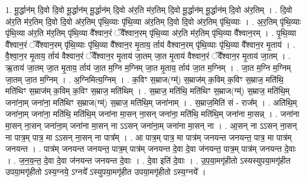 \documentclass[17pt]{extarticle}
\begin{document}
1. मू॒र्द्धान॑म् दि॒वो दि॒वो मू॒र्द्धान॑म् मू॒र्द्धान॑म् दि॒वो अ॑र॒ति म॑र॒तिम् दि॒वो मू॒र्द्धान॑म् मू॒र्द्धान॑म् दि॒वो अ॑र॒तिम् । . दि॒वो अ॑र॒ति म॑र॒तिम् दि॒वो दि॒वो अ॑र॒तिम् पृ॑थि॒व्याः पृ॑थि॒व्या अ॑र॒तिम् दि॒वो दि॒वो अ॑र॒तिम् पृ॑थि॒व्याः । . अ॒र॒तिम् पृ॑थि॒व्याः पृ॑थि॒व्या अ॑र॒ति म॑र॒तिम् पृ॑थि॒व्या वै᳚श्वान॒रं ॅवै᳚श्वान॒रम् पृ॑थि॒व्या अ॑र॒ति म॑र॒तिम् पृ॑थि॒व्या वै᳚श्वान॒रम् । . पृ॒थि॒व्या वै᳚श्वान॒रं ॅवै᳚श्वान॒रम् पृ॑थि॒व्याः पृ॑थि॒व्या वै᳚श्वान॒र मृ॒ताय॒ र्ताय॑ वैश्वान॒रम् पृ॑थि॒व्याः पृ॑थि॒व्या वै᳚श्वान॒र मृ॒ताय॑ । . वै॒श्वा॒न॒र मृ॒ताय॒ र्ताय॑ वैश्वान॒रं ॅवै᳚श्वान॒र मृ॒ताय॑ जा॒तम् जा॒त मृ॒ताय॑ वैश्वान॒रं ॅवै᳚श्वान॒र मृ॒ताय॑ जा॒तम् । . ऋ॒ताय॑ जा॒तम् जा॒त मृ॒ताय॒ र्ताय॑ जा॒त म॒ग्नि म॒ग्निम् जा॒त मृ॒ताय॒ र्ताय॑ जा॒त म॒ग्निम् । . जा॒त म॒ग्नि म॒ग्निम् जा॒तम् जा॒त म॒ग्निम् । . अ॒ग्निमित्य॒ग्निम् । . क॒विꣳ स॒म्राज(ग्म्॑) स॒म्राज॑म् क॒विम् क॒विꣳ स॒म्राज॒ मति॑थि॒ मति॑थिꣳ स॒म्राज॑म् क॒विम् क॒विꣳ स॒म्राज॒ मति॑थिम् । . स॒म्राज॒ मति॑थि॒ मति॑थिꣳ स॒म्राज(ग्म्॑) स॒म्राज॒ मति॑थि॒म् जना॑ना॒म् जना॑ना॒ मति॑थिꣳ स॒म्राज(ग्म्॑) स॒म्राज॒ मति॑थि॒म् जना॑नाम् । . स॒म्राज॒मिति॑ सं - राज᳚म् । . अति॑थि॒म् जना॑ना॒म् जना॑ना॒ मति॑थि॒ मति॑थि॒म् जना॑ना मा॒सन् ना॒सन् जना॑ना॒ मति॑थि॒ मति॑थि॒म् जना॑ना मा॒सन्न् । . जना॑ना मा॒सन् ना॒सन् जना॑ना॒म् जना॑ना मा॒सन् ना ऽऽसन् जना॑ना॒म् जना॑ना मा॒सन् ना । . आ॒सन् ना ऽऽसन् ना॒सन् ना पात्र॒म् पात्र॒ मा ऽऽसन् ना॒सन् ना पात्र᳚म् । . आ पात्र॒म् पात्र॒ मा पात्र॑म् जनयन्त जनयन्त॒ पात्र॒ मा पात्र॑म् जनयन्त । . पात्र॑म् जनयन्त जनयन्त॒ पात्र॒म् पात्र॑म् जनयन्त दे॒वा दे॒वा ज॑नयन्त॒ पात्र॒म् पात्र॑म् जनयन्त दे॒वाः । . ज॒न॒य॒न्त॒ दे॒वा दे॒वा ज॑नयन्त जनयन्त दे॒वाः । . दे॒वा इति॑ दे॒वाः । . उ॒प॒या॒मगृ॑हीतो ऽस्यस्युपया॒मगृ॑हीत उपया॒मगृ॑हीतो ऽस्य॒ग्नये॒ ऽग्नये᳚ ऽस्युपया॒मगृ॑हीत उपया॒मगृ॑हीतो ऽस्य॒ग्नये᳚ । \newline
\end{document}
